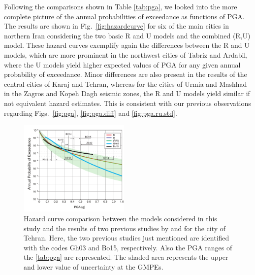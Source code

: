 
Following the comparisons shown in Table \ref{tab:pga}, we looked into the more complete picture of the annual probabilities of exceedance as functions of PGA. The results are shown in Fig.~\ref{fig:hazardcurve} for six of the main cities in northern Iran considering the two basic R and U models and the combined (R,U) model. These hazard curves exemplify again the differences between the R and U models, which are more prominent in the northwest cities of Tabriz and Ardabil, where the U models yield higher expected values of PGA for any given annual probability of exceedance. Minor differences are also present in the results of the central cities of Karaj and Tehran, whereas for the cities of Urmia and Mashhad in the Zagros and Kopeh Dagh seismic zones, the R and U models yield similar if not equivalent hazard estimates. This is consistent with our previous observations regarding Figs.~\ref{fig:pga}, \ref{fig:pga.diff} and \ref{fig:pga.ru.std}.

\begin{figure}[t]
    \centering
    \includegraphics[width=0.48\textwidth]{figures/pdf/figure-14}
    \caption{Hazard curve comparison between the models considered in this study and the results of two previous studies by \citet{Ghodrati2003} and \citet{Boostan2015} for the city of Tehran. Here, the two previous studies just mentioned are identified with the codes Gh03 and Bo15, respectively. Also the PGA ranges of the \ref{tab:pga} are represented. The shaded area represents the upper and lower value of uncertainty at the GMPEs.}
    \label{fig:tehran}
\end{figure}

